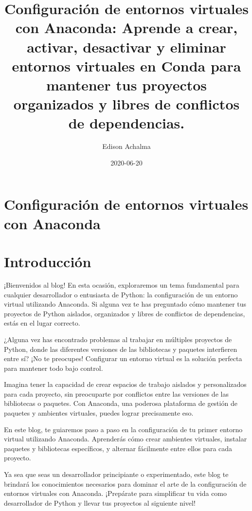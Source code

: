\documentclass[
  jou,
  floatsintext,
  longtable,
  a4paper,
  nolmodern,
  notxfonts,
  notimes,
  colorlinks=true,linkcolor=blue,citecolor=blue,urlcolor=blue]{apa7}
\title{Configuración de entornos virtuales con Anaconda: Aprende a
crear, activar, desactivar y eliminar entornos virtuales en Conda para
mantener tus proyectos organizados y libres de conflictos de
dependencias.}
\author{Edison Achalma}
\affiliation{
{Escuela Profesional de Economía, Universidad Nacional de San Cristóbal
de Huamanga}}
\date{2020-06-20}
\begin{document}
\maketitle

\hypertarget{toc}{}
\tableofcontents
\newpage
\section[Introduction]{Configuración de entornos virtuales con Anaconda}

\setcounter{secnumdepth}{-\maxdimen} %

\setlength\LTleft{0pt}


\section{Introducción}\label{introducciuxf3n}

¡Bienvenidos al blog! En esta ocasión, exploraremos un tema fundamental
para cualquier desarrollador o entusiasta de Python: la configuración de
un entorno virtual utilizando Anaconda. Si alguna vez te has preguntado
cómo mantener tus proyectos de Python aislados, organizados y libres de
conflictos de dependencias, estás en el lugar correcto.

¿Alguna vez has encontrado problemas al trabajar en múltiples proyectos
de Python, donde las diferentes versiones de las bibliotecas y paquetes
interfieren entre sí? ¡No te preocupes! Configurar un entorno virtual es
la solución perfecta para mantener todo bajo control.

Imagina tener la capacidad de crear espacios de trabajo aislados y
personalizados para cada proyecto, sin preocuparte por conflictos entre
las versiones de las bibliotecas o paquetes. Con Anaconda, una poderosa
plataforma de gestión de paquetes y ambientes virtuales, puedes lograr
precisamente eso.

En este blog, te guiaremos paso a paso en la configuración de tu primer
entorno virtual utilizando Anaconda. Aprenderás cómo crear ambientes
virtuales, instalar paquetes y bibliotecas específicos, y alternar
fácilmente entre ellos para cada proyecto.

Ya sea que seas un desarrollador principiante o experimentado, este blog
te brindará los conocimientos necesarios para dominar el arte de la
configuración de entornos virtuales con Anaconda. ¡Prepárate para
simplificar tu vida como desarrollador de Python y llevar tus proyectos
al siguiente nivel!
\end{document}

